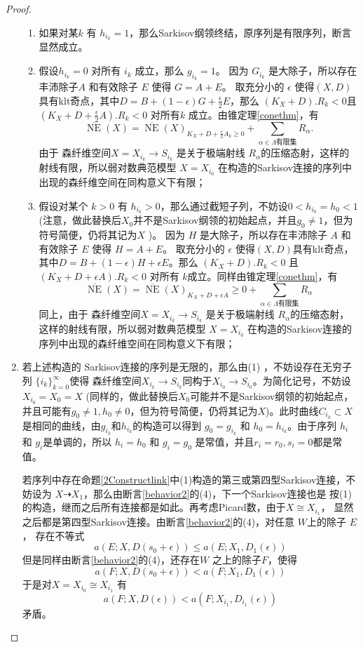 \begin{proof}
\begin{enumerate}
\begin{enumerate}
        \item 如果对某$k$ 有  $h_{i_{k}}=1$，那么Sarkisov纲领终结，原序列是有限序列，断言显然成立。
        \item 假设$h_{i_{k}}=0$ 对所有 $i_{k}$ 成立，那么 $g_{i_{k}}=1$。 因为 $G_{i_{k}}$ 是大除子，所以存在丰沛除子$A$ 和有效除子 $E$ 使得 $G=A+E$。  取充分小的 $\epsilon$ 使得$(X,D)$具有klt奇点，其中$D=B+(1-\epsilon)G+\frac{\epsilon}{2} E$，那么 $(K_{X}+D).R_{k}<0$且 $(K_{X}+D+\frac{\epsilon}{2} A).R_{k}<0$ 对所有$k$ 成立。由锥定理\ref{conethm}，有
              \[ \overline{\operatorname{NE}}(X)=\overline{\operatorname{NE}}(X)_{K_{X}+D+\frac{\epsilon}{2}A_{k}\geqslant 0} +\sum_{\alpha \in\Lambda\text{有限集}}R_{\alpha}. \]
              由于 森纤维空间$X=X_{i_{k}}\to S_{i_{k}}$ 是关于极端射线 $R_{\alpha}$的压缩态射，这样的射线有限，所以弱对数典范模型 $X=X_{i_{0}}$ 在构造的Sarkisov连接的序列中出现的森纤维空间在同构意义下有限；
            \item 假设对某个 $k>0$ 有  $h_{i_{k}}>0$，那么通过截短子列，不妨设$0<h_{i_{0}}=h_{0}<1$ (注意，做此替换后$X_{0}$并不是Sarkisov纲领的初始起点，并且$g_{0}\neq 1$，但为符号简便，仍将其记为$X$  )。 因为 $H$ 是大除子，所以存在丰沛除子 $A$ 和有效除子 $E$ 使得 $H=A+E$。  取充分小的 $\epsilon$ 使得$(X,D)$具有klt奇点，其中$D=B+(1-\epsilon)H+\epsilon E$。那么 $(K_{X}+D).R_{k}<0$ 且 $(K_{X}+D+\epsilon A).R_{k}<0$ 对所有 $k$成立。同样由锥定理\ref{conethm}，有
              \[ \overline{\operatorname{NE}}(X)=\overline{\operatorname{NE}}(X)_{K_{X}+D+\epsilon A}\geqslant 0 +\sum_{\alpha \in\Lambda\text{有限集}}R_{\alpha} \]
              同上，由于 森纤维空间$X=X_{i_{k}}\to S_{i_{k}}$ 是关于极端射线 $R_{\alpha}$的压缩态射，这样的射线有限，所以弱对数典范模型 $X=X_{i_{0}}$ 在构造的Sarkisov连接的序列中出现的森纤维空间在同构意义下有限；
      \end{enumerate}
    \item 若上述构造的 Sarkisov连接的序列是无限的，那么由(1) ，不妨设存在无穷子列 $\{i_{k}\}_{k=0}^{\infty} $使得 森纤维空间$X_{i_{k}}\to S_{i_{k}}$同构于$X_{i_{0}}\to S_{i_{0}}$。为简化记号，不妨设$X_{i_{0}}=X_{0}=X$ (同样的，做此替换后$X_{0}$可能并不是Sarkisov纲领的初始起点，并且可能有$g_{0}\neq 1,h_{0}\neq 0$，但为符号简便，仍将其记为$X$)。此时曲线$C_{i_{k}} \subset X$是相同的曲线，由$g_{i_{k}}$和$h_{i_{k}}$的构造可以得到 $g_{0}=g_{i_{k}}$ 和 $h_{0}=h_{i_{k}}$。由于序列 $h_{i}$ 和 $g_{i}$是单调的，所以 $h_{i}=h_{0}$ 和  $g_{i}=g_{0}$ 是常值，并且$r_{i}=r_{0},s_{i}=0$都是常值。

      若序列中存在命题\ref{2Constructlink}中(1)构造的第三或第四型Sarkisov连接，不妨设为 $X\dashrightarrow X_{1}$，那么由断言\ref{behavior2}的(4)，下一个Sarkisov连接也是 按(1)的构造，继而之后所有连接都是如此。再考虑Picard数，由于$X\cong X_{i_{1}}$， 显然之后都是第四型Sarkisov连接。由断言\ref{behavior2}的(4)，对任意 $ W$上的除子 $E$， 存在不等式
      \[ a(E;X,D(s_{0}+\epsilon))\leqslant a(E;X_{1},D_{1}(\epsilon))\] 
      但是同样由断言\ref{behavior2}的(4)，还存在$W$ 之上的除子$F$，使得 
      \[a(F;X,D(s_{0}+\epsilon))< a(F;X_{1},D_{1}(\epsilon))\]
      于是对$ X = X_{i_{0}}\cong X_{i_{1}} $ 有
      \[a(F;X,D(\epsilon))< a(F;X_{i_{1}},D_{i_{1}}(\epsilon))\]
      矛盾。


\end{enumerate}
\end{proof}
